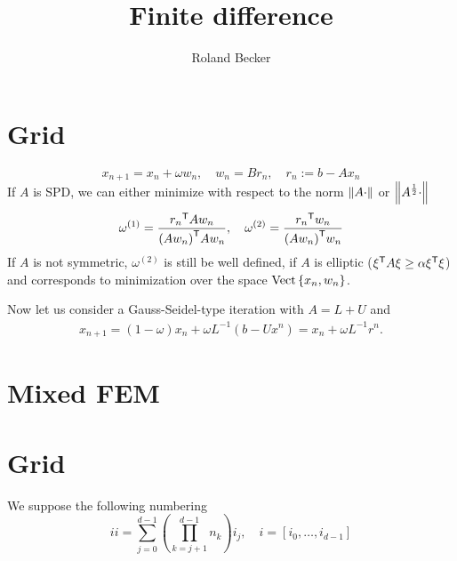 \documentclass[12pt, english]{article}
\title{Finite difference}
\author{Roland Becker}
\begin{document}
\maketitle
%
%
\section{Grid}\label{sec:}
%
%
\begin{equation}\label{eq:}
x_{n+1} = x_n + \omega w_n,\quad  w_n = B r_n, \quad r_n := b - A x_n
\end{equation}
%
If $A$ is SPD, we can either minimize with respect to the norm $\left\|A\cdot\right\|$ or $\left\|A^{\frac12}\cdot\right\|$
%
\begin{align*}
\omega^{(1)} = \frac{{r_n}^{\mathsf{T}}{Aw_n}}{{(Aw_n)}^{\mathsf{T}}{Aw_n}},\quad
\omega^{(2)} = \frac{{r_n}^{\mathsf{T}}{w_n}}{{(Aw_n)}^{\mathsf{T}}{w_n}}
\end{align*}
%
If $A$ is not symmetric, $\omega^{(2)}$ is still be well defined, if $A$ is elliptic (${\xi}^{\mathsf{T}}A\xi\ge \alpha{\xi}^{\mathsf{T}}\xi$) and corresponds to minimization over the space $\operatorname{Vect}\left\{x_n, w_n\right\}$.

Now let us consider a Gauss-Seidel-type iteration with $A=L+U$ and
%
\begin{align*}
x_{n+1} = (1-\omega)x_n + \omega L^{-1}(b- U x^n) = x_n +  \omega L^{-1}r^n.
\end{align*}
%


%
\section{Mixed FEM}\label{sec:}
%

%
\section{Grid}\label{sec:}
%
We suppose the following numbering
%
\begin{equation}\label{eq:}
ii = \sum_{j=0}^{d-1}\left(\prod_{k=j+1}^{d-1}n_k\right) i_j,\quad i=[i_0,\ldots,i_{d-1}]
\end{equation}
%
%
%
\end{document}
